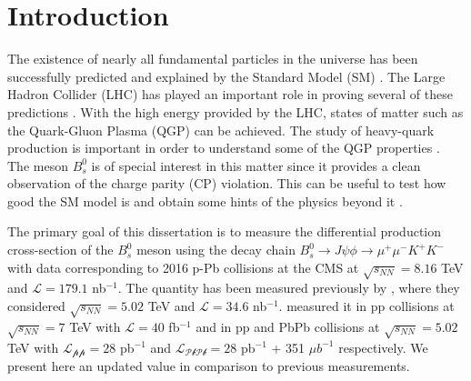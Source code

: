 \chapter*{Introduction}
\label{chap:Introduction}
The existence of nearly all fundamental particles in the universe has been successfully predicted and explained by the Standard Model (SM) \cite{stiller2016full}. The Large Hadron Collider (LHC) has played an important role in proving several of these predictions \cite{baron2018desarrollo}. With the high energy provided by the LHC, states of matter such as the Quark-Gluon Plasma (QGP) can be achieved. The study of heavy-quark production is important in order to understand some of the QGP properties \cite{aziz2021z}. The meson $B^0_s$ is of special interest in this matter since it provides a clean observation of the charge parity (CP) violation. This can be useful to test how good the SM model is and obtain some hints of the physics beyond it \cite{greevenanalysis}.

The primary goal of this dissertation is to measure the differential production cross-section of the $B^0_s$ meson using the decay chain $B^0_s \to J\psi \phi \to \mu^{+}\mu^{-} K^{+}K^{-}$ with data corresponding to 2016 p-Pb collisions at the CMS at  $\sqrt{s_{NN}} = 8.16$ TeV and $\mathcal{L} = 179.1$ nb$^{-1}$. The quantity has been measured previously by \cite{khachatryan2016study}, where they considered $\sqrt{s_{NN}} = 5.02$ TeV and $\mathcal{L} = 34.6$ nb$^{-1}$. \cite{chatrchyan2011measurement} measured it in pp collisions at $\sqrt{s_{NN}} = 7$ TeV with $\mathcal{L} = 40$ fb$^{-1}$ and \cite{canelli2019measurement} in pp and PbPb collisions at $\sqrt{s_{NN}} = 5.02$ TeV with $\mathcal{L_{\text{pp}}} = 28$ pb$^{-1}$ and $\mathcal{L_{\text{PbPb}}} = 28$ pb$^{-1}$ + 351 $\mu b^{-1}$ respectively. We present here an updated value in comparison to previous measurements.

